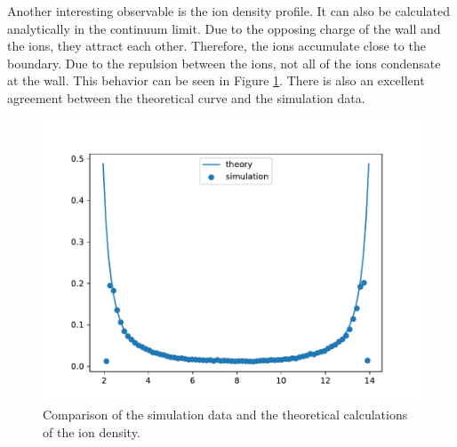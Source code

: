 Another interesting observable is the ion density profile. It can also be calculated analytically in the continuum limit. Due to the opposing charge of the wall and the ions, they attract each other. Therefore, the ions accumulate close to the boundary. Due to the repulsion between  the ions, not all of the ions condensate at the wall. This behavior can be seen in Figure \ref{fig:slit_plot2}. There is also an excellent agreement between the theoretical curve and the simulation data.
\begin{figure}[H]
	\centering
	\includegraphics[width=\columnwidth]{slit_pore/prodrun_figs/id}
	\captionsetup{width=\columnwidth}
	\caption{Comparison of the simulation data and the theoretical calculations of the ion density.}
	\label{fig:slit_plot2}
\end{figure}
